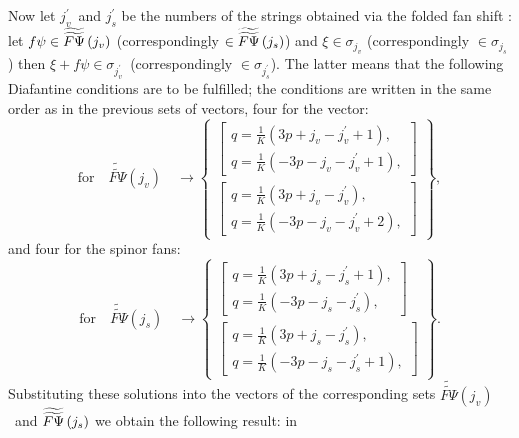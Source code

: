 \documentclass{article}
\begin{document}
Now let $j_{v}^{\prime }$\ and $j_{s}^{\prime }$ be the numbers of the
strings obtained via the folded fan shift : let $f\psi \in \widetilde{%
\widetilde{F\Psi }}\left( j_{v}\right) $ (correspondingly $\in \widetilde{%
\widetilde{F\Psi }}\left( j_{s}\right) $) and $\xi \in \sigma _{j_{v}}$
(correspondingly $\in \sigma _{j_{s}}$) then $\xi +f\psi \in \sigma
_{j_{v}^{\prime }}$\ (correspondingly $\in \sigma _{j_{s}^{\prime }}$). The
latter means that the following Diafantine conditions are to be fulfilled;
the conditions are written in the same order as in the previous sets of
vectors, four for the vector:
\begin{equation*}
\mathrm{for}\quad \widetilde{\widetilde{F\Psi }}\left( j_{v}\right) \quad
\rightarrow \left\{
\begin{array}{c}
\left[
\begin{array}{c}
q=\frac{1}{K}\left( 3p+j_{v}-j_{v}^{\prime }+1\right) , \\
q=\frac{1}{K}\left( -3p-j_{v}-j_{v}^{\prime }+1\right) ,
\end{array}
\right]  \\
\left[
\begin{array}{c}
q=\frac{1}{K}\left( 3p+j_{v}-j_{v}^{\prime }\right) , \\
q=\frac{1}{K}\left( -3p-j_{v}-j_{v}^{\prime }+2\right) ,
\end{array}
\right]
\end{array}
\right\} ,
\end{equation*}
and four for the spinor fans:
\begin{equation*}
\mathrm{for}\quad \widetilde{\widetilde{F\Psi }}\left( j_{s}\right) \quad
\rightarrow \left\{
\begin{array}{c}
\left[
\begin{array}{c}
q=\frac{1}{K}\left( 3p+j_{s}-j_{s}^{\prime }+1\right) , \\
q=\frac{1}{K}\left( -3p-j_{s}-j_{s}^{\prime }\right) ,
\end{array}
\right]  \\
\left[
\begin{array}{c}
q=\frac{1}{K}\left( 3p+j_{s}-j_{s}^{\prime }\right) , \\
q=\frac{1}{K}\left( -3p-j_{s}-j_{s}^{\prime }+1\right) ,
\end{array}
\right]
\end{array}
\right\} .
\end{equation*}
Substituting these solutions into the vectors of the corresponding sets $%
\widetilde{\widetilde{F\Psi }}\left( j_{v}\right) $\ and $\widetilde{%
\widetilde{F\Psi }}\left( j_{s}\right) $ we obtain the following result: in
\end{document}
